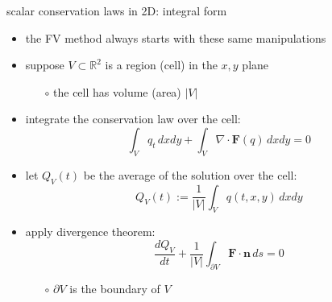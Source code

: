 \documentclass[10pt,hyperref,dvipsnames]{beamer}
\newcommand{\bn}{\mathbf{n}}
\newcommand{\bF}{\mathbf{F}}
\newcommand{\Div}{\nabla\cdot}
\newcommand{\RR}{\mathbb{R}}
\begin{document}
\begin{frame}{scalar conservation laws in 2D: integral form}

\begin{itemize}
\item the FV method always starts with these same manipulations
\item suppose $V \subset \RR^2$ is a region (cell) in the $x,y$ plane
    \begin{itemize}
    \item[$\circ$] the cell has volume (area) $|V|$
    \end{itemize}
\item integrate the conservation law over the cell:
    $$\int_V q_t\,dx dy + \int_V \Div \bF(q)\,dx dy = 0$$
\item let $Q_V(t)$ be the average of the solution over the cell:
    $$Q_V(t) := \frac{1}{|V|} \int_V q(t,x,y)\,dx dy$$
\item apply divergence theorem:
    $$\frac{dQ_V}{dt} + \frac{1}{|V|} \int_{\partial V} \bF\cdot \bn\,ds = 0$$

    \begin{itemize}
    \item[$\circ$] $\partial V$ is the boundary of $V$
    \end{itemize}
\end{itemize}
\end{frame}
\end{document}
